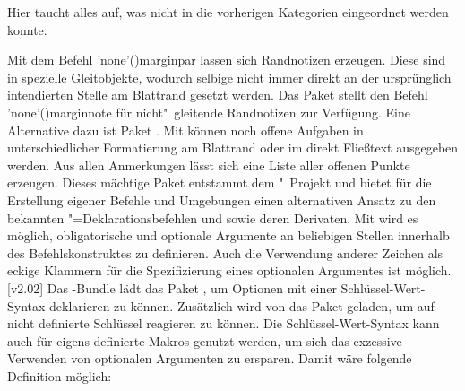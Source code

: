 Hier taucht alles auf, was nicht in die vorherigen Kategorien eingeordnet 
werden konnte.

\begin{DeclarePackages}
  Mit dem Befehl \Macro'none'(){marginpar} lassen sich 
  Randnotizen erzeugen. Diese sind in  spezielle Gleitobjekte, 
  wodurch selbige nicht immer direkt an der ursprünglich intendierten Stelle am 
  Blattrand gesetzt werden. Das Paket  stellt den Befehl 
  \Macro'none'(){marginnote} für nicht"~gleitende 
  Randnotizen zur Verfügung. Eine Alternative dazu ist Paket .
  Mit  können noch offene Aufgaben in unterschiedlicher 
  Formatierung am Blattrand oder im direkt Fließtext ausgegeben werden. Aus 
  allen Anmerkungen lässt sich eine Liste aller offenen Punkte erzeugen.
  Dieses mächtige Paket entstammt dem "~Projekt und bietet 
  für die Erstellung eigener Befehle und Umgebungen einen alternativen Ansatz 
  zu den bekannten "=Deklarationsbefehlen  
  und  sowie deren Derivaten. Mit  wird 
  es möglich, obligatorische und optionale Argumente an beliebigen Stellen 
  innerhalb des Befehlskonstruktes zu definieren. Auch die Verwendung anderer 
  Zeichen als eckige Klammern für die Spezifizierung eines optionalen 
  Argumentes ist möglich.
[v2.02]
  Das \KOMAScript-Bundle lädt das Paket , um Optionen mit 
  einer Schlüssel-Wert-Syntax deklarieren zu können. Zusätzlich wird von 
  \TUDScript das Paket  geladen, um auf nicht definierte 
  Schlüssel reagieren zu können. Die Schlüssel-Wert-Syntax kann auch für 
  eigens definierte Makros genutzt werden, um sich das exzessive Verwenden von 
  optionalen Argumenten zu ersparen. Damit wäre folgende Definition möglich:
  

\end{DeclarePackages}

